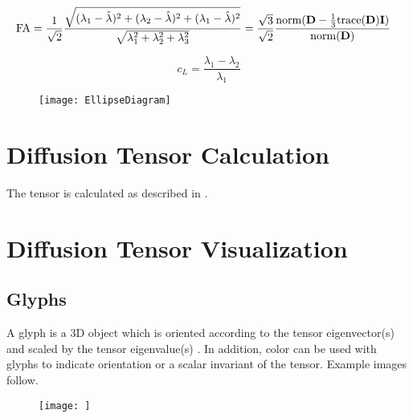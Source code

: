 \documentclass{InsightArticle}
\begin{document}
\begin{eqnarray}
\label{eq:FA}
{\rm FA} &= \frac{1}{\sqrt{2}} \frac{\sqrt{(\lambda_1-\hat\lambda)^2 +
     (\lambda_2-\hat\lambda)^2 + (\lambda_1-\hat\lambda)^2}}
     {\sqrt{\lambda_1^2 + \lambda_2^2 + \lambda_3^2}} =
     \frac{\sqrt{3}}{\sqrt{2}} \frac{{\rm norm}({\bf D} - \frac{1}{3}{\rm
     trace}({\bf D}){\bf I})}{{\rm norm}({\bf D})}
\end{eqnarray}

\begin{equation}
\label{eq:diffMeasuresWestin}
c_L = \frac{\lambda_1 - \lambda_2}{\lambda_1}
\end{equation}

\begin{figure}
\center
\texttt{[image: EllipseDiagram]}


\label{fig:TensorDiagram}
\end{figure}




\section{Diffusion Tensor Calculation}
The tensor is calculated as described in \cite{}.


\section{Diffusion Tensor Visualization}

\subsection{Glyphs}
A glyph is a 3D object which is oriented according to the tensor
eigenvector(s) and scaled by the tensor eigenvalue(s)
\cite{basserBIOPHYS94,kindlmann04}.  In addition, color can be used
with glyphs to indicate orientation or a scalar invariant of the
tensor.  Example images follow.

\begin{figure}
\center
\texttt{[image: ]}
\label{fig:GlyphLineLinear}
\end{figure}
\end{document}
